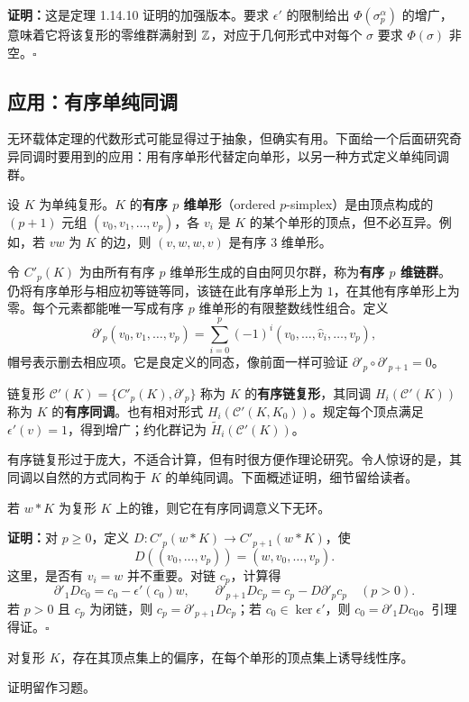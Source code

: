 \noindent\textbf{证明：}这是定理 1.14.10 证明的加强版本。要求 $\epsilon'$ 的限制给出 $\Phi(\sigma_p^\alpha)$ 的增广，意味着它将该复形的零维群满射到 $\mathbb{Z}$，对应于几何形式中对每个 $\sigma$ 要求 $\Phi(\sigma)$ 非空。\hfill$\square$

\subsection*{应用：有序单纯同调}
无环载体定理的代数形式可能显得过于抽象，但确实有用。下面给一个后面研究奇异同调时要用到的应用：用有序单形代替定向单形，以另一种方式定义单纯同调群。

设 $K$ 为单纯复形。$K$ 的\textbf{有序 $p$ 维单形}（ordered $p$-simplex）是由顶点构成的 $(p+1)$ 元组 $(v_0,v_1,\ldots,v_p)$，各 $v_i$ 是 $K$ 的某个单形的顶点，但不必互异。例如，若 $vw$ 为 $K$ 的边，则 $(v,w,w,v)$ 是有序 $3$ 维单形。

令 $C'_p(K)$ 为由所有有序 $p$ 维单形生成的自由阿贝尔群，称为\textbf{有序 $p$ 维链群}。仍将有序单形与相应初等链等同，该链在此有序单形上为 $1$，在其他有序单形上为零。每个元素都能唯一写成有序 $p$ 维单形的有限整数线性组合。定义
\[
\partial'_p(v_0,v_1,\ldots,v_p)=\sum_{i=0}^p(-1)^i(v_0,\ldots,\widehat v_i,\ldots,v_p),
\]
帽号表示删去相应项。它是良定义的同态，像前面一样可验证 $\partial'_p\circ\partial'_{p+1}=0$。

链复形 $\mathcal C'(K)=\{C'_p(K),\partial'_p\}$ 称为 $K$ 的\textbf{有序链复形}，其同调 $H_i(\mathcal C'(K))$ 称为 $K$ 的\textbf{有序同调}。也有相对形式 $H_i(\mathcal C'(K,K_0))$。规定每个顶点满足 $\epsilon'(v)=1$，得到增广；约化群记为 $\widetilde H_i(\mathcal C'(K))$。

有序链复形过于庞大，不适合计算，但有时很方便作理论研究。令人惊讶的是，其同调以自然的方式同构于 $K$ 的单纯同调。下面概述证明，细节留给读者。

若 $w*K$ 为复形 $K$ 上的锥，则它在有序同调意义下无环。

\noindent\textbf{证明：}对 $p\geq0$，定义 $D:C'_p(w*K)\to C'_{p+1}(w*K)$，使
\[
D((v_0,\ldots,v_p))=(w,v_0,\ldots,v_p).
\]
这里，是否有 $v_i=w$ 并不重要。对链 $c_p$，计算得
\[
\partial'_1Dc_0=c_0-\epsilon'(c_0)w,\qquad
\partial'_{p+1}Dc_p=c_p-D\partial'_pc_p\quad(p>0).
\]
若 $p>0$ 且 $c_p$ 为闭链，则 $c_p=\partial'_{p+1}Dc_p$；若 $c_0\in\ker\epsilon'$，则 $c_0=\partial'_1Dc_0$。引理得证。\hfill$\square$

对复形 $K$，存在其顶点集上的偏序，在每个单形的顶点集上诱导线性序。

证明留作习题。


